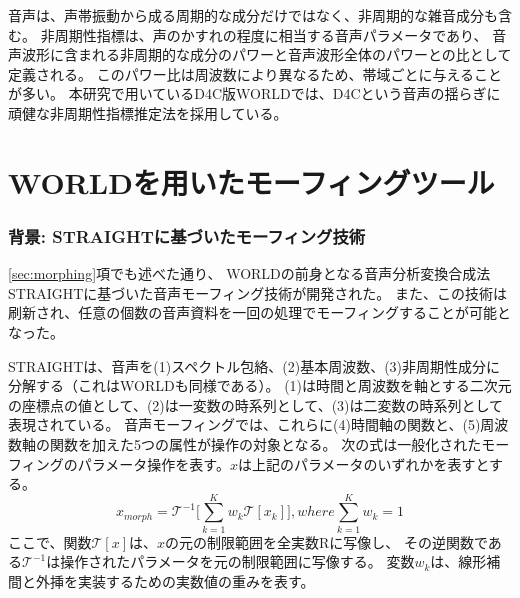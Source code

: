 音声は、声帯振動から成る周期的な成分だけではなく、非周期的な雑音成分も含む。
非周期性指標は、声のかすれの程度に相当する音声パラメータであり、
音声波形に含まれる非周期的な成分のパワーと音声波形全体のパワーとの比として定義される。
このパワー比は周波数により異なるため、帯域ごとに与えることが多い。
本研究で用いているD4C版WORLDでは、D4C\cite{morise2016worldD4Ce}という音声の揺らぎに頑健な非周期性指標推定法を採用している。


\section{WORLDを用いたモーフィングツール\cite{kawahara2024interactive,kawahara2022WORLDGUI_J,kawahara2014morph}}
\label{sec:morphTools}
\subsubsection{背景: STRAIGHTに基づいたモーフィング技術}
\ref{sec:morphing}項でも述べた通り、
WORLDの前身となる音声分析変換合成法STRAIGHT\cite{kawahara1999restructuring}に基づいた音声モーフィング技術が開発された\cite{matsui2003STRAIGHT}。
また、この技術は刷新され、任意の個数の音声資料を一回の処理でモーフィングすることが可能となった\cite{kawahara2013morph,kawahara2014morph}。

STRAIGHTは、音声を(1)スペクトル包絡、(2)基本周波数、(3)非周期性成分に分解する（これはWORLDも同様である）。
(1)は時間と周波数を軸とする二次元の座標点の値として、(2)は一変数の時系列として、(3)は二変数の時系列として表現されている。 
音声モーフィングでは、これらに(4)時間軸の関数と、(5)周波数軸の関数を加えた5つの属性が操作の対象となる。
次の式は一般化されたモーフィングのパラメータ操作を表す。$x$は上記のパラメータのいずれかを表すとする。
\begin{equation}
    x_{morph} = \mathcal{T}^{-1}\Bigg[\sum^{K}_{k=1}w_k \mathcal{T}[x_k]\Bigg] , where \sum^{K}_{k=1}w_k = 1
\end{equation}
ここで、関数$\mathcal{T}[x]$は、$x$の元の制限範囲を全実数Rに写像し、
その逆関数である$\mathcal{T}^{-1}$は操作されたパラメータを元の制限範囲に写像する。
変数$w_k$は、線形補間と外挿を実装するための実数値の重みを表す。

